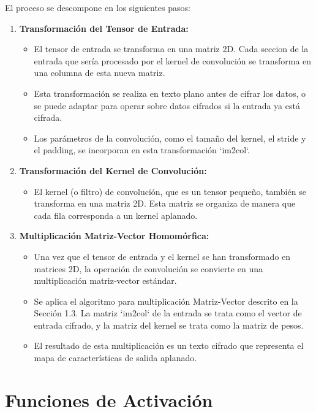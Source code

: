 El proceso se descompone en los siguientes pasos:

\begin{enumerate}
    \item \textbf{Transformación del Tensor de Entrada:}
    \begin{itemize}
        \item El tensor de entrada se transforma en una matriz 2D. Cada seccion de la entrada que sería procesado por el kernel de convolución se transforma en una columna de esta nueva matriz.
        \item Esta transformación se realiza en texto plano antes de cifrar los datos, o se puede adaptar para operar sobre datos cifrados si la entrada ya está cifrada.
        \item Los parámetros de la convolución, como el tamaño del kernel, el stride y el padding, se incorporan en esta transformación `im2col`.
    \end{itemize}

    \item \textbf{Transformación del Kernel de Convolución:}
    \begin{itemize}
        \item El kernel (o filtro) de convolución, que es un tensor pequeño, también se transforma en una matriz 2D. Esta matriz se organiza de manera que cada fila corresponda a un kernel aplanado.
    \end{itemize}

    \item \textbf{Multiplicación Matriz-Vector Homomórfica:}
    \begin{itemize}
        \item Una vez que el tensor de entrada y el kernel se han transformado en matrices 2D, la operación de convolución se convierte en una multiplicación matriz-vector estándar.
        \item Se aplica el algoritmo para multiplicación Matriz-Vector descrito en la Sección 1.3. La matriz `im2col` de la entrada se trata como el vector de entrada cifrado, y la matriz del kernel se trata como la matriz de pesos.
        \item El resultado de esta multiplicación es un texto cifrado que representa el mapa de características de salida aplanado.
    \end{itemize}
\end{enumerate}

\section{Funciones de Activación}

